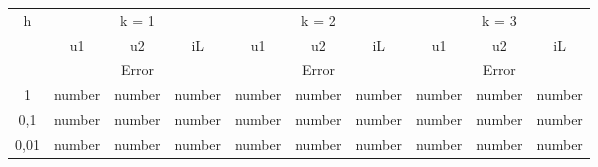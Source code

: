 	\begin{center}
		\begin{tabular}{ c || c c c | c c c | c c c | } 
			h & \multicolumn{3}{c|}{k = 1} & \multicolumn{3}{c|}{k = 2} & \multicolumn{3}{c|}{k = 3} \\
			& u1 & u2 & iL & u1 & u2 & iL & u1 & u2 & iL \\
			\hline
			& \multicolumn{3}{c|}{Error} & \multicolumn{3}{c|}{Error} & \multicolumn{3}{c|}{Error} \\
			\hline
			1 & number & number & number & number & number & number & number & number & number \\
			0,1 & number & number & number & number & number & number & number & number & number \\
			0,01 & number & number & number & number & number & number & number & number & number
		\end{tabular}
	\end{center}